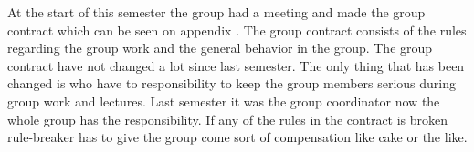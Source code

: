At the start of this semester the group had a meeting and made the group contract which can be seen on appendix . The group contract consists of the rules regarding the group work and the general behavior in the group. The group contract have not changed a lot since last semester. The only thing that has been changed is who have to responsibility to keep the group members serious during group work and lectures. Last semester it was the group coordinator now the whole group has the responsibility. If any of the rules in the contract is broken rule-breaker has to give the group come sort of compensation like cake or the like.